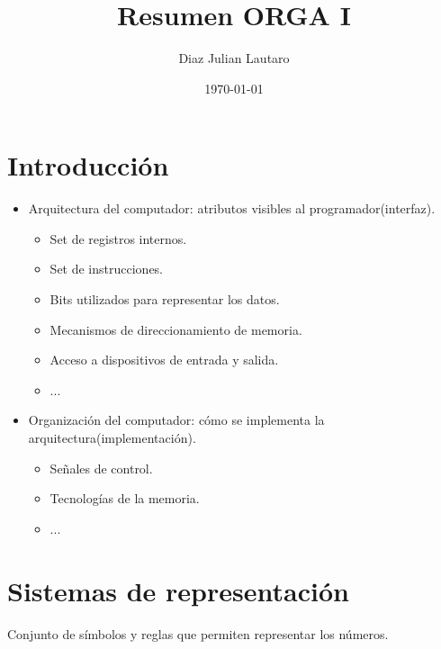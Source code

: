 \documentclass[a4paper,12pt]{article}
\title{Resumen ORGA I}
\author{Diaz Julian Lautaro}
\date{\today}
\begin{document}
\maketitle

\tableofcontents
\newpage

\section{Introducción}

\begin{itemize}
  \item Arquitectura del computador: atributos visibles al programador(interfaz).
  \begin{itemize}
    \item Set de registros internos.
    \item Set de instrucciones.
    \item Bits utilizados para representar los datos.
    \item Mecanismos de direccionamiento de memoria.
    \item Acceso a dispositivos de entrada y salida.
    \item ...
  \end{itemize}
  \item Organización del computador: cómo se implementa la arquitectura(implementación).
  \begin{itemize}
    \item Señales de control.
    \item Tecnologías de la memoria.
    \item ...
  \end{itemize}
\end{itemize}

\section{Sistemas de representación}
Conjunto de símbolos y reglas que permiten representar los números.
\end{document}
